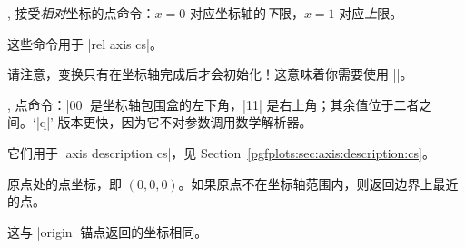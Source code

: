 \begin{commandlist}{%
    \pgfplotspointrelaxisxy{},
    \pgfplotspointrelaxisxyz{}%
}
    接受\emph{相对}坐标的点命令：$x=0$ 对应坐标轴的\emph{下}限，$x=1$ 对应\emph{上}限。

    这些命令用于 |rel axis cs|。

    请注意，变换只有在坐标轴完成后才会初始化！这意味着你需要使用 |\pgfplotsextra|。
\end{commandlist}

\begin{commandlist}{%
    \pgfplotspointdescriptionxy{},
    \pgfplotsqpointdescriptionxy{}%
}
    点命令：|{0}{0}| 是坐标轴包围盒的左下角，|{1}{1}| 是右上角；其余值位于二者之间。`|q|' 版本更快，因为它不对参数调用数学解析器。

    它们用于 |axis description cs|，见
    Section~\ref{pgfplots:sec:axis:description:cs}。
\end{commandlist}

\begin{commandlist}{\pgfplotspointaxisorigin}
    原点处的点坐标，即 $(0,0,0)$。如果原点不在坐标轴范围内，则返回边界上最近的点。

    这与 |origin| 锚点返回的坐标相同。
\end{commandlist}

